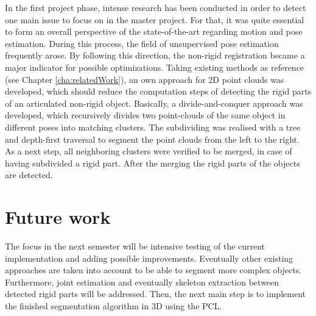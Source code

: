 \documentclass[notitlepage,english]{hgbreport}
\begin{document}
	In the first project phase, intense research has been conducted in order to detect one main issue to focus on in the master project. For that, it was quite essential to form an overall perspective of the state-of-the-art regarding motion and pose estimation. During this process, the field of unsupervised pose estimation frequently arose. By following this direction, the non-rigid registration became a major indicator for possible optimizations. Taking existing methods as reference (see Chapter \ref{cha:relatedWork}), an own approach for 2D point clouds was developed, which should reduce the computation steps of detecting the rigid parts of an articulated non-rigid object. Basically, a divide-and-conquer approach was developed, which recursively divides two point-clouds of the same object in different poses into matching clusters. The subdividing was realised with a tree and depth-first traversal to segment the point clouds from the left to the right. As a next step, all neighboring clusters were verified to be merged, in case of having subdivided a rigid part. After the merging the rigid parts of the objects are detected. 
	
	\section{Future work}
	
	The focus in the next semester will be intensive testing of the current implementation and adding possible improvements. Eventually other existing approaches are taken into account to be able to segment more complex objects. Furthermore, joint estimation and eventually skeleton extraction between detected rigid parts will be addressed. Then, the next main step is to implement the finished segmentation algorithm in 3D using the PCL.
	
	
	\MakeBibliography[nosplit]
\end{document}
